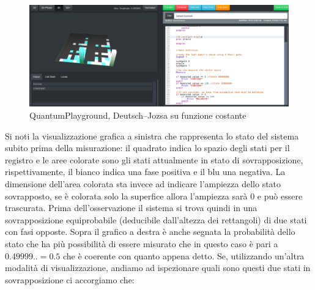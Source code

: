 \documentclass[12pt,a4paper,openright]{report}
\begin{document}
\begin{figure}[h]
    \centering
    \includegraphics[width=\textwidth,height=\textheight,keepaspectratio]{constantFunction}
    \caption{QuantumPlayground, Deutsch–Jozsa su funzione costante}
\end{figure}
Si noti la visualizzazione grafica a sinistra che rappresenta lo stato del sistema subito prima della misurazione: il quadrato indica
lo spazio degli stati per il registro e le aree colorate sono gli stati attualmente in stato di sovrapposizione, rispettivamente,
il bianco indica una fase positiva e il blu una negativa. La dimensione dell'area colorata sta invece ad indicare l'ampiezza dello
stato sovrapposto, se è colorata solo la superfice allora l'ampiezza sarà 0 e può essere trascurata. Prima dell'osservazione
il sistema si trova quindi in una sovrapposizione equiprobabile (deducibile dall'altezza dei rettangoli) di due stati con fasi opposte.
Sopra il grafico a destra è anche segnata la probabilità dello stato che ha più possibilità di essere misurato che in questo caso
è pari a $0.49999..=0.5$ che è coerente con quanto appena detto. Se, utilizzando un'altra modalità di visualizzazione, andiamo
ad ispezionare quali sono questi due stati in sovrapposizione ci accorgiamo che: 
\end{document}
